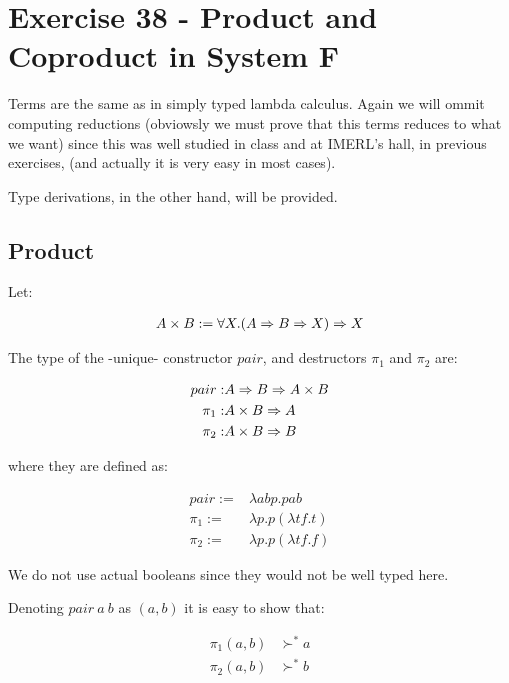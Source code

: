 \section{Exercise 38 - Product and Coproduct in System F}


Terms are the same as in simply typed lambda calculus.
Again we will ommit computing reductions (obviowsly we must prove that
this terms reduces to what we want) since this was
well studied in class and at IMERL's hall, in previous exercises,
(and actually it is very easy in most cases).

Type derivations, in the other hand, will be provided.


\subsection*{Product}

Let:

\begin{align*}
  A \times B := \forall X. (A\Rightarrow B\Rightarrow X) \Rightarrow X \nonumber
\end{align*}
  
  The type of the -unique- constructor $pair$, and destructors $\pi_1$ and
  $\pi_2$ are:

\begin{align}
  pair  :& A \Rightarrow B \Rightarrow A\times B  \nonumber \\
  \pi_1 :& A \times B \Rightarrow A        \nonumber \\
  \pi_2 :& A \times B \Rightarrow B        \nonumber
\end{align}
  
  where they are defined as:

\begin{align}
  pair :=& \lambda a b p . p a b        \nonumber \\
  \pi_1:=& \lambda p. p (\lambda t f.t) \nonumber \\
  \pi_2:=& \lambda p. p (\lambda t f.f) \nonumber
\end{align}

We do not use actual booleans since they would not be well typed here.

Denoting $pair\ a\ b$ as $(a,b)$ it is easy to show that:

\begin{align*}
  \pi_1 (a,b) &\succ^{*} a \\
  \pi_2 (a,b) &\succ^{*} b
\end{align*}

